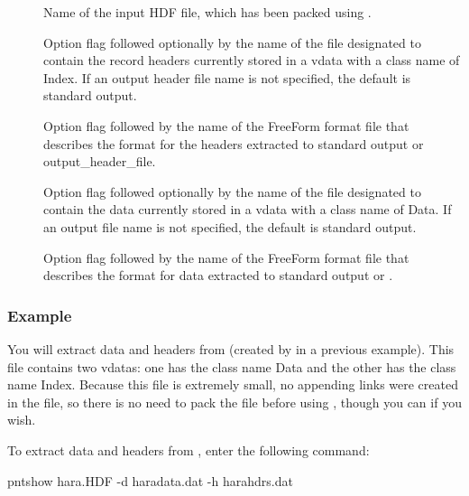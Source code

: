 \begin{description}

\item[]
  
  Name of the input HDF file, which has been packed using
  .

\item[\hdfh]
  
  Option flag followed optionally by the name of the file designated
  to contain the record headers currently stored in a vdata with a
  class name of Index. If an output header file name is not specified,
  the default is standard output.

\item[\hdfhof]
  
  Option flag followed by the name of the FreeForm format file that
  describes the format for the headers extracted to standard output or
  output\_header\_file.

\item[\hdfd]
  
  Option flag followed optionally by the name of the file designated
  to contain the data currently stored in a vdata with a class name of
  Data. If an output file name is not specified, the default is
  standard output.

\item[\hdfdof]
  
  Option flag followed by the name of the FreeForm format file that
  describes the format for data extracted to standard output or
  .
\end{description}

\subsubsection{Example}

You will extract data and headers from  (created by
 in a previous example). This file contains two vdatas:
one has the class name Data and the other has the class name Index.
Because this file is extremely small, no appending links were created
in the file, so there is no need to pack the file before using
, though you can if you wish.

To extract data and headers from , enter the following
command:

\begin{example}
pntshow hara.HDF -d haradata.dat -h harahdrs.dat 
\end{example}

